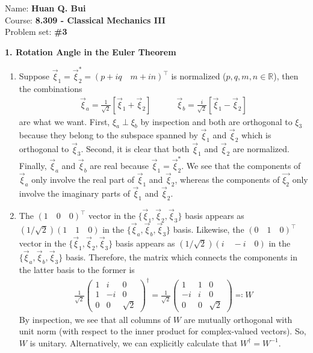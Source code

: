 \documentclass{article}
\theoremstyle{definition}
\newcommand{\f}[2]{\frac{#1}{#2}}
\newcommand{\lb}{\left[}
\newcommand{\rb}{\right]}
\begin{document}
\begin{framed}
	\noindent Name: \textbf{Huan Q. Bui}\\
	Course: \textbf{8.309 - Classical Mechanics III}\\
	Problem set: \textbf{\#3}
\end{framed}
	
	


\noindent \textbf{1. Rotation Angle in the Euler Theorem}


\begin{enumerate}[label=(\alph*)]
	\item Suppose $\vec{\xi}_1 = \vec{\xi}_2^* = (p+iq \quad m+in)^\top$ is normalized ($p,q,m,n\in \mathbb{R}$), then the combinations
	\begin{align*}
	\boxed{\vec{\xi}_a = \f{1}{\sqrt{2}}\lb \vec{\xi}_1 + \vec{\xi}_2  \rb \quad\quad\quad 
	\vec{\xi}_b = \f{i}{\sqrt{2}}\lb \vec{\xi}_1 - \vec{\xi}_2 \rb}
	\end{align*}
	are what we want. First,  $\xi_a \perp \xi_b$ by inspection and both are orthogonal to $\xi_3$ because they belong to the subspace spanned by $\vec{\xi}_1$ and $\vec{\xi}_2$ which is orthogonal to $\vec{\xi}_3$. Second, it is clear that both $\vec{\xi}_1$ and $\vec{\xi}_2$ are normalized. Finally, $\vec{\xi}_a$ and $\vec{\xi}_b$ are real because $\vec{\xi}_1 = \vec{\xi}_2^*$. We see that the components of $\vec{\xi}_a$ only involve the real part of $\vec{\xi}_1$ and $\vec{\xi}_2$, whereas the components of $\vec{\xi_2}$ only involve the imaginary parts of $\vec{\xi}_1$ and $\vec{\xi}_2$. 
	
	
	\item The $(1\quad 0 \quad 0)^\top$ vector in the $\{\vec{\xi}_1, \vec{\xi}_2, \vec{\xi}_3\}$ basis appears as $(1/\sqrt{2}) (1\quad 1\quad 0)$ in the $\{\vec{\xi}_a, \vec{\xi}_b, \vec{\xi}_3\}$ basis. Likewise, the $(0\quad 1 \quad 0)^\top$ vector in the $\{\vec{\xi}_1, \vec{\xi}_2, \vec{\xi}_3\}$ basis appears as $(1/\sqrt{2}) (i\quad -i\quad 0)$ in the $\{\vec{\xi}_a, \vec{\xi}_b, \vec{\xi}_3\}$ basis. Therefore, the matrix which connects the components in the latter basis to the former is 
	\begin{align*}
	\f{1}{\sqrt{2}}\begin{pmatrix}
	1 & i & 0\\
	1 & -i & 0 \\
	0 & 0 & \sqrt{2}
	\end{pmatrix}^\dagger = \boxed{\f{1}{\sqrt{2}}\begin{pmatrix}
	1 & 1 & 0 \\ -i & i & 0 \\ 0 & 0 & \sqrt{2}
	\end{pmatrix} \eqcolon W}
	\end{align*}
	By inspection, we see that all columns of $W$ are mutually orthogonal with unit norm (with respect to the inner product for complex-valued vectors). So, $W$ is unitary. Alternatively, we can explicitly calculate that $W^\dagger = W^{-1}$. 
	

\end{enumerate}
\end{document}
